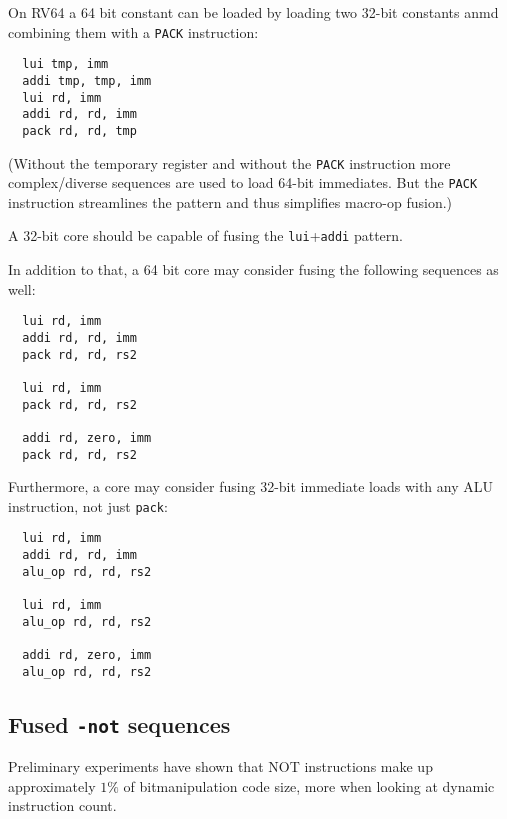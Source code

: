 On RV64 a 64 bit constant can be loaded by loading two 32-bit constants anmd combining them
with a {\tt PACK} instruction:

\begin{minipage}{\linewidth}
\begin{verbatim}
  lui tmp, imm
  addi tmp, tmp, imm
  lui rd, imm
  addi rd, rd, imm
  pack rd, rd, tmp
\end{verbatim}
\end{minipage}

(Without the temporary register and without the {\tt PACK} instruction more complex/diverse
sequences are used to load 64-bit immediates. But the {\tt PACK} instruction streamlines
the pattern and thus simplifies macro-op fusion.)

A 32-bit core should be capable of fusing the {\tt lui}+{\tt addi} pattern.

In addition to that, a 64 bit core may consider fusing the following sequences as well:

\begin{minipage}{\linewidth}
\begin{verbatim}
  lui rd, imm
  addi rd, rd, imm
  pack rd, rd, rs2

  lui rd, imm
  pack rd, rd, rs2

  addi rd, zero, imm
  pack rd, rd, rs2
\end{verbatim}
\end{minipage}

Furthermore, a core may consider fusing 32-bit immediate loads with any ALU
instruction, not just {\tt pack}:

\begin{minipage}{\linewidth}
\begin{verbatim}
  lui rd, imm
  addi rd, rd, imm
  alu_op rd, rd, rs2

  lui rd, imm
  alu_op rd, rd, rs2

  addi rd, zero, imm
  alu_op rd, rd, rs2
\end{verbatim}
\end{minipage}


\subsection{Fused {\tt *-not} sequences}

Preliminary experiments have shown that NOT instructions make up approximately
$1\%$ of bitmanipulation code size, more when looking at dynamic instruction count.~\cite{Wolf17A}

